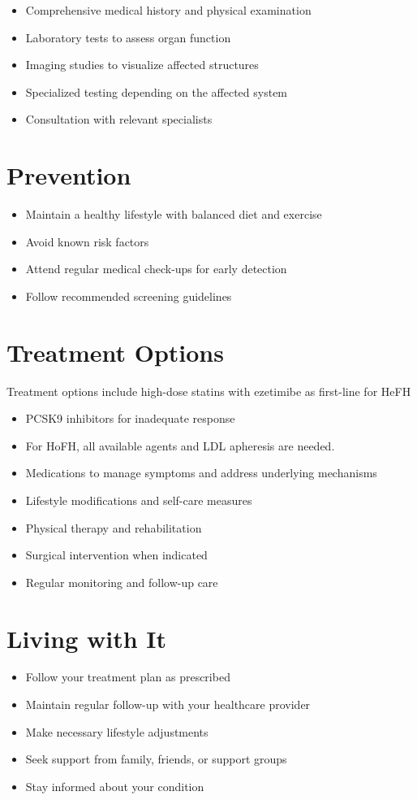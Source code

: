 \begin{itemize}[noitemsep]
  \item Comprehensive medical history and physical examination
  \item Laboratory tests to assess organ function
  \item Imaging studies to visualize affected structures
  \item Specialized testing depending on the affected system
  \item Consultation with relevant specialists
\end{itemize}
\section{Prevention}
\begin{itemize}[noitemsep]
  \item Maintain a healthy lifestyle with balanced diet and exercise
  \item Avoid known risk factors
  \item Attend regular medical check-ups for early detection
  \item Follow recommended screening guidelines
\end{itemize}
\section{Treatment Options}
Treatment options include high-dose statins with ezetimibe as first-line for HeFH

\begin{itemize}[noitemsep]
  \item PCSK9 inhibitors for inadequate response
  \item For HoFH, all available agents and LDL apheresis are needed.
  \item Medications to manage symptoms and address underlying mechanisms
  \item Lifestyle modifications and self-care measures
  \item Physical therapy and rehabilitation
  \item Surgical intervention when indicated
  \item Regular monitoring and follow-up care
\end{itemize}
\section{Living with It}
\begin{itemize}[noitemsep]
  \item Follow your treatment plan as prescribed
  \item Maintain regular follow-up with your healthcare provider
  \item Make necessary lifestyle adjustments
  \item Seek support from family, friends, or support groups
  \item Stay informed about your condition
\end{itemize}
